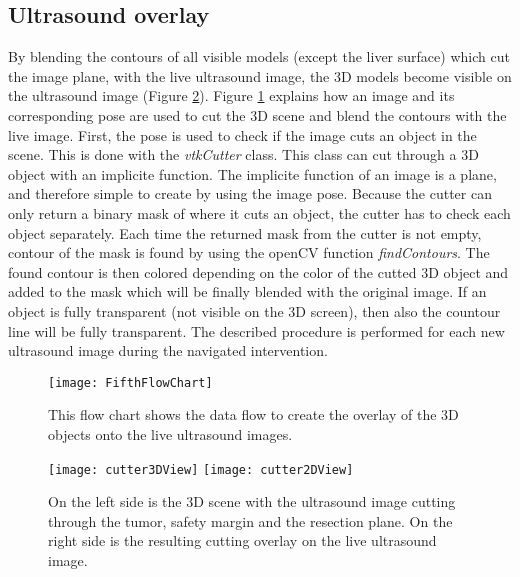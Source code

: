 \subsection{Ultrasound overlay}
By blending the contours of all visible models (except the liver surface) which cut the image plane,
with the live ultrasound image, the 3D models become visible on the ultrasound
image (Figure \ref{fig:cutterExample}). Figure \ref{fig:FifthFlowChart} explains how an image and its
corresponding pose are used to cut the 3D scene and blend the contours with the
live image. First, the pose is used to check if the image cuts an object in the
scene. This is done with the \textit{vtkCutter} class. This class can cut
through a 3D object with an implicite function. The implicite function of an
image is a plane, and therefore simple to create by using the image pose. Because the
cutter can only return a binary mask of where it cuts an object, the cutter
has to check each object separately. Each time the returned mask from the cutter
is not empty, contour of the mask is found by using the openCV function
\textit{findContours}. The found contour is then colored depending on the color
of the cutted 3D object and added to the mask which will be finally blended with
the original image. If an object is fully transparent (not visible on the 3D
screen), then also the countour line will be fully transparent. The described procedure is performed for each new ultrasound image
during the navigated intervention. 
\begin{figure}[H]
  \centering
 \texttt{[image: FifthFlowChart]}
  \caption{This flow chart shows the data flow to create the overlay of the 3D
    objects onto the live ultrasound images.}
  \label{fig:FifthFlowChart}
\end{figure}
\begin{figure}[H]
  \centering
  \texttt{[image: cutter3DView]} 
  \endminipage
  \hfill
  \texttt{[image: cutter2DView]}
  \endminipage
  \hfill 
 \caption{On the left side is the 3D scene with the ultrasound image cutting
   through the tumor, safety margin and the resection plane. On the right side
   is the resulting cutting overlay on the live ultrasound image.}
  \label{fig:cutterExample}
\end{figure}
